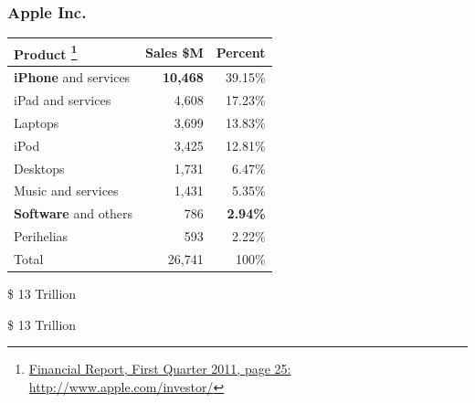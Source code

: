 \documentclass[18pt]{beamer}
\begin{document}
{
\begin{frame}
\frametitle{Apple Inc.}

\begin{center}
\begin{tabular}{lrr}
\hline
\textbf{Product}
\footnote{
\href{http://phx.corporate-ir.net/External.File?item=UGFyZW50SUQ9NzgwODJ8Q2hpbGRJRD0tMXxUeXBlPTM=&t=1}
{Financial Report, First Quarter 2011, page 25:}
 \url{http://www.apple.com/investor/} }
& \textbf{Sales \$M}
& \textbf{Percent} \\
\hline
\hline
\textbf{iPhone} and services & \textbf{10,468} &  39.15\%  \\
iPad and services & 4,608 & 17.23\% \\
Laptops & 3,699 & 13.83\% \\
iPod & 3,425 & 12.81\% \\
Desktops & 1,731 & 6.47\% \\
Music and services & 1,431 & 5.35\%  \\
\textbf{Software} and others &  786 & \textbf{2.94\%} \\
Perihelias &  593 & 2.22\% \\
\hline
Total &  26,741 & 100\% \\
\end{tabular}

\end{center}
\end{frame}
}


{
\begin{frame}[plain]
\fontsize{72pt}{90pt}\selectfont
\center
\begin{center}
\$ 13 Trillion
\end{center}
\end{frame}
}

{
\begin{frame}[plain]
\fontsize{72pt}{90pt}\selectfont
\center
\begin{center}
\$ 13 Trillion
\end{center}
\end{frame}
}
\end{document}
